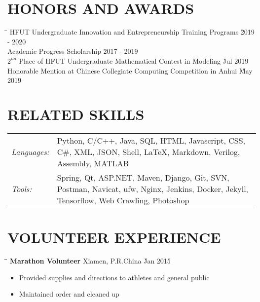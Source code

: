\documentclass{res}
\begin{document}
\begin{resume}
\vspace{-0.15in}	    
\section{HONORS AND AWARDS}  
    \vspace{-0.1in}	
    \begin{tabbing}
    \hspace{5in}\= \kill %
    HFUT Undergraduate Innovation and Entrepreneurship Training Programs \` 2019 - 2020 \\
    Academic Progress Scholarship \` 2017 - 2019  \\
    $2^{nd}$ Place of HFUT Undergraduate Mathematical Contest in Modeling \` Jul 2019 \\
    Honorable Mention at Chinese Collegiate Computing Competition in Anhui \` May 2019 
    \end{tabbing}\vspace{-20pt}      %
   
\vspace{+0.05in}	
\section{RELATED SKILLS}  
    \vspace{+0.05in}	 
    \begin{tabular}{l p{4.6in}}
    {\sl Languages:} & Python, C/C++, Java, SQL, HTML, Javascript, CSS, 
                       C\#, XML, JSON, Shell, LaTeX, Markdown, Verilog, 
                       Assembly, MATLAB \\ 
    {\sl Tools:}  &  Spring, Qt, ASP.NET, Maven, Django, Git, SVN, Postman, 
                        Navicat, ufw, Nginx, Jenkins, Docker, Jekyll, 
                        Tensorflow, Web Crawling, Photoshop
    \end{tabular}   

\vspace{-0.12in}	
\section{VOLUNTEER EXPERIENCE}
    \vspace{-0.1in}
    \begin{tabbing}
    \hspace{2.3in}\= \hspace{2.6in}\= \kill %
    {\bf Marathon Volunteer} \> Xiamen, P.R.China     \` Jan 2015\\
    \end{tabbing}\vspace{-20pt}      %
    \begin{itemize} \itemsep -2pt %
    \item Provided supplies and directions to athletes and general public
    \item Maintained order and cleaned up
    \end{itemize}


\end{resume}
\end{document}

